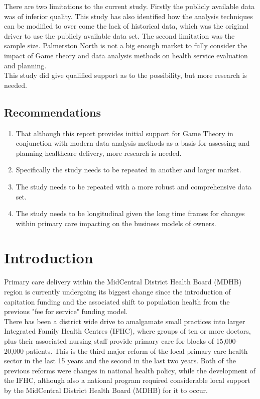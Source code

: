 \documentclass[11pt,a4paper]{article}
\begin{document}
There are two limitations to the current study. Firstly the publicly available data was of inferior quality. This study has also identified how the analysis techniques can be modified to over come the lack of historical data, which was the original driver to use the publicly available data set. The second limitation was the sample size. Palmerston North is not a big enough market to fully consider the impact of Game theory and data analysis methods on health service evaluation and planning.\\

This study did give qualified support as to the possibility, but more research is needed.\\

\subsection{Recommendations}
 
\begin{enumerate}
\item That although this report provides initial support for Game Theory in conjunction with modern data analysis methods as a basis for assessing and planning healthcare delivery, more research is needed.
\item Specifically the study needs to be repeated in another and larger market.
\item The study needs to be repeated with a more robust and comprehensive data set.
\item The study needs to be longitudinal given the long time frames for changes within primary care impacting on the business models of owners.
\end{enumerate}
\pagebreak

\tableofcontents

\pagebreak
\pagebreak

\listoffigures

\pagebreak
\section{Introduction}
Primary care delivery within the MidCentral District Health Board (MDHB) region is currently undergoing its biggest change since the introduction of capitation funding and the associated shift to population health from the previous "fee for service" funding model.\\

There has been a district wide drive to amalgamate small practices into larger Integrated Family Health Centres (IFHC), where groups of ten or more doctors, plus their associated nursing staff provide primary care for blocks of  15,000-20,000 patients. This is the third major reform of the local primary care health sector in the last 15 years and the second in the last two years. Both of the previous reforms were changes in national health policy, while the development of the IFHC, although also a national program required considerable local support by the MidCentral District Health Board (MDHB) for it to occur. \\
\end{document}

